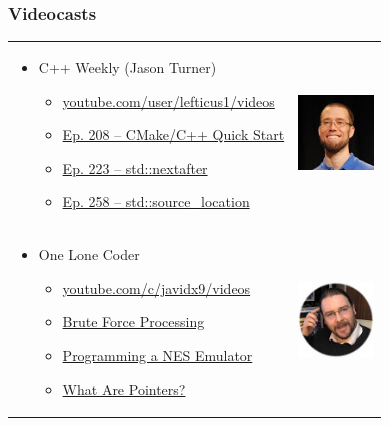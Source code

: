\documentclass{beamer}
\begin{document}
\begin{frame}
\frametitle{Videocasts}
{\centering
\begin{tabular}{m{8.5cm} m{2cm}}
\begin{itemize}
  \item C++ Weekly (Jason Turner)
  \begin{itemize}
    \item \href{https://www.youtube.com/user/lefticus1/videos}{youtube.com/user/lefticus1/videos}
    \item \href{https://www.youtube.com/watch?v=YbgH7yat-Jo}{Ep. 208 -- CMake/C++ Quick Start}
    \item \href{https://www.youtube.com/watch?v=-F0j2VN4xEU}{Ep. 223 -- std::nextafter}
    \item \href{https://www.youtube.com/watch?v=TAS85xmNDEc}{Ep. 258 -- std::source\_location}
  \end{itemize}
\end{itemize} &
\includegraphics[width=2cm]{pics/vcast_lefticus.jpg} \\

\begin{itemize}
  \item One Lone Coder
  \begin{itemize}
    \item \href{https://www.youtube.com/c/javidx9/videos}{youtube.com/c/javidx9/videos}
    \item \href{https://www.youtube.com/watch?v=PBvLs88hvJ8}{Brute Force Processing}
    \item \href{https://www.youtube.com/watch?v=F8kx56OZQhg}{Programming a NES Emulator}
    \item \href{https://www.youtube.com/watch?v=iChalAKXffs}{What Are Pointers?}
  \end{itemize}
\end{itemize} &
\includegraphics[width=2cm]{pics/vcast_olc.jpg} \\
\end{tabular}
}
\end{frame}
\end{document}
